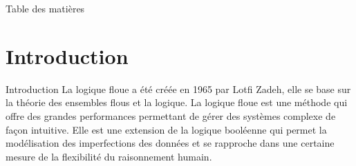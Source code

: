 \documentclass[aspectratio=169,professionalfonts, 12pt]{beamer}
\date{\today}
\begin{document}

\begin{frame}[plain]
  \titlepage
\end{frame}

  

  \begin{frame}[plain]{Table des matières}
    \tableofcontents
  \end{frame}

\section{Introduction}

\begin{frame}{Introduction}
  La logique floue a été créée en 1965 par Lotfi Zadeh, elle se base sur la théorie
  des ensembles flous et la logique. La logique floue est une méthode qui offre des grandes
  performances permettant de gérer des systèmes complexe de façon intuitive. Elle est
  une extension de la logique booléenne qui permet la modélisation des imperfections des données
  et se rapproche dans une certaine mesure de la flexibilité du raisonnement humain.
\end{frame}
\end{document}
